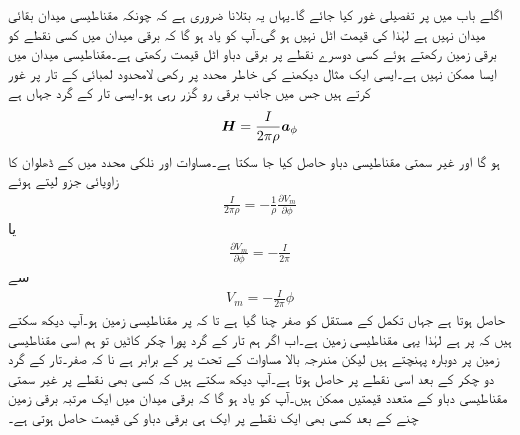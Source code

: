 اگلے باب میں  پر تفصیلی غور کیا جائے گا۔یہاں یہ بتلانا ضروری ہے کہ چونکہ مقناطیسی میدان  بقائی میدان نہیں ہے لہٰذا  کی قیمت اٹل نہیں ہو گی۔آپ کو یاد ہو گا کہ برقی میدان میں کسی نقطے کو برقی زمین رکھتے ہوئے کسی دوسرے نقطے پر برقی دباو اٹل قیمت رکھتی ہے۔مقناطیسی میدان میں ایسا ممکن نہیں ہے۔ایسی ایک مثال دیکھنے کی خاطر  محدد پر رکھی لامحدود لمبائی کے تار پر غور کرتے ہیں جس میں  جانب  برقی رو گزر رہی ہو۔ایسی تار کے گرد جہاں  ہے
\begin{align*}
{\ensuremath{{\boldsymbol{H}}}}=\frac{I}{2\pi \rho} {\boldsymbol{a}}_{\phi}
\end{align*}
ہو گا اور غیر سمتی مقناطیسی دباو حاصل کیا جا سکتا ہے۔مساوات  اور نلکی محدد میں  کے ڈھلوان کا زاویائی جزو لیتے ہوئے
\begin{align*}
\frac{I}{2\pi \rho} =-\frac{1}{\rho} \frac{\partial V_m}{\partial \phi}
\end{align*}
یا
\begin{align*}
\frac{\partial V_m}{\partial \phi}=-\frac{I}{2\pi}
\end{align*}
سے
\begin{align*}
V_m=-\frac{I}{2\pi}\phi
\end{align*}
حاصل ہوتا ہے جہاں تکمل کے مستقل کو صفر چنا گیا ہے تا کہ  پر مقناطیسی زمین ہو۔آپ دیکھ سکتے ہیں کہ  پر  ہے لہٰذا یہی مقناطیسی زمین ہے۔اب اگر ہم تار کے گرد پورا چکر کاٹیں تو ہم اسی مقناطیسی زمین پر دوبارہ پہنچتے ہیں لیکن مندرجہ بالا مساوات کے تحت  پر  کے برابر ہے نا کہ صفر۔تار کے گرد دو چکر کے بعد اسی نقطے پر  حاصل ہوتا ہے۔آپ دیکھ سکتے ہیں کہ کسی بھی نقطے پر غیر سمتی مقناطیسی دباو کے متعدد قیمتیں ممکن ہیں۔آپ کو یاد ہو گا کہ برقی میدان میں ایک مرتبہ برقی زمین چنے کے بعد کسی بھی ایک نقطے پر ایک ہی برقی دباو کی قیمت حاصل ہوتی ہے۔

